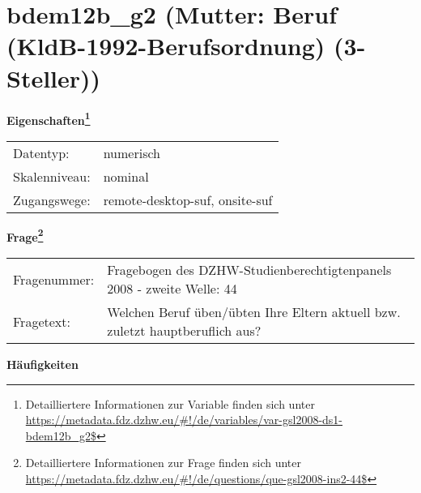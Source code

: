 
    \setcounter{footnote}{0}

    \vspace*{-1.8cm}
	\section{bdem12b\_g2 (Mutter: Beruf (KldB-1992-Berufsordnung) (3-Steller))}
	\label{section:bdem12b_g2}



    \vspace*{0.5cm}
    \noindent\textbf{Eigenschaften\footnote{Detailliertere Informationen zur Variable finden sich unter
		\url{https://metadata.fdz.dzhw.eu/\#!/de/variables/var-gsl2008-ds1-bdem12b_g2$}}}\\
	\begin{tabularx}{\hsize}{@{}lX}
	Datentyp: & numerisch \\
	Skalenniveau: & nominal \\
	Zugangswege: &
	  remote-desktop-suf, 
	  onsite-suf
 \\
    \end{tabularx}



				\vspace*{0.5cm}
                \noindent\textbf{Frage\footnote{Detailliertere Informationen zur Frage finden sich unter
		              \url{https://metadata.fdz.dzhw.eu/\#!/de/questions/que-gsl2008-ins2-44$}}}\\
				\begin{tabularx}{\hsize}{@{}lX}
					Fragenummer: &
					  Fragebogen des DZHW-Studienberechtigtenpanels 2008 - zweite Welle:
					  44
 \\
					Fragetext: & Welchen Beruf üben/übten Ihre Eltern aktuell bzw. zuletzt hauptberuflich aus? \\
				\end{tabularx}





        		\vspace*{0.5cm}
                \noindent\textbf{Häufigkeiten}

